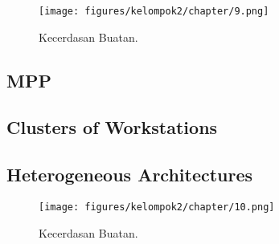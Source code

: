\begin{figure}[H]
	\texttt{[image: figures/kelompok2/chapter/9.png]}
	\centering
	\caption{Kecerdasan Buatan.}
\end{figure}

\subsection{MPP}

\subsection{Clusters of Workstations}

\subsection{Heterogeneous Architectures}

\begin{figure}[H]
	\texttt{[image: figures/kelompok2/chapter/10.png]}
	\centering
	\caption{Kecerdasan Buatan.}
\end{figure}
